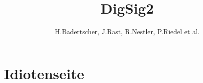 \documentclass{scrartcl}
\title{DigSig2}
\author{H.Badertscher, J.Rast, R.Nestler, P.Riedel et al.}
\begin{document}
\maketitle
\newpage

\tableofcontents
\newpage


\begin{multicols}{2}

\newpage

\end{multicols}





\section{Idiotenseite}



\begin{multicols}{2}






\end{multicols}

\end{document}
